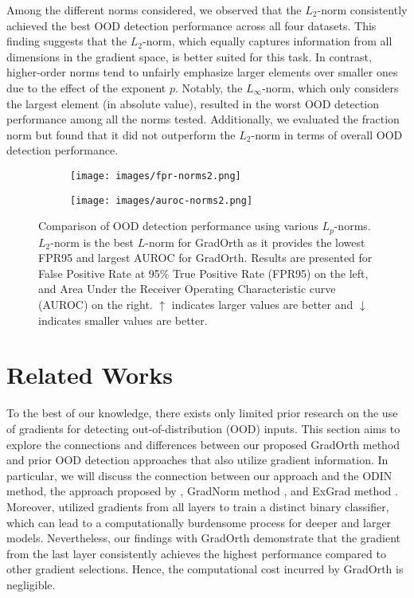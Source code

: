 \documentclass{article}
\begin{document}
Among the different norms considered, we observed that the $L_2$-norm consistently achieved the best OOD detection performance across all four datasets. This finding suggests that the $L_2$-norm, which equally captures information from all dimensions in the gradient space, is better suited for this task. In contrast, higher-order norms tend to unfairly emphasize larger elements over smaller ones due to the effect of the exponent $p$. Notably, the $L_{\infty}$-norm, which only considers the largest element (in absolute value), resulted in the worst OOD detection performance among all the norms tested. Additionally, we evaluated the fraction norm but found that it did not outperform the $L_2$-norm in terms of overall OOD detection performance.
\begin{figure}[h!]
     \centering
     \begin{subfigure}[b]{0.48\textwidth}
         \centering
         \texttt{[image: images/fpr-norms2.png]}
         \label{fig:fpr95}
     \end{subfigure}
     \hfill
     \begin{subfigure}[b]{0.48\textwidth}
         \centering
         \texttt{[image: images/auroc-norms2.png]}
         \label{fig:auroc}
     \end{subfigure}
     \vspace{-5mm}
    \caption{ Comparison of OOD detection performance using various $L_p$-norms. $L_2$-norm is the best $L$-norm for GradOrth as it provides the lowest FPR95 and largest AUROC for GradOrth. Results are presented for False Positive Rate at 95\% True Positive Rate (FPR95) on the left, and Area Under the Receiver Operating Characteristic curve (AUROC) on the right. $\uparrow$ indicates larger values are better and $\downarrow$ indicates smaller values are better.}
        \label{fig:norm}
        \vspace{-4mm}
\end{figure}
\section{Related Works}
To the best of our knowledge, there exists only limited prior research on the use of gradients for detecting out-of-distribution (OOD) inputs. This section aims to explore the connections and differences between our proposed GradOrth method and prior OOD detection approaches that also utilize gradient information. In particular, we will discuss the connection between our approach and the ODIN method, the approach proposed by \cite{lee2020gradients}, GradNorm method \cite{huang2021importance}, and ExGrad method \cite{igoe2022useful}. 
Moreover, \cite{lee2020gradients} utilized gradients from all layers to train a distinct binary classifier, which can lead to a computationally burdensome process for deeper and larger models. Nevertheless, our findings with GradOrth demonstrate that the gradient from the last layer consistently achieves the highest performance compared to other gradient selections. Hence, the computational cost incurred by GradOrth is negligible.
\end{document}
